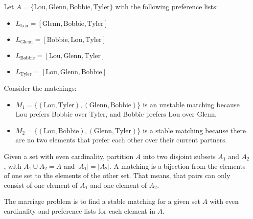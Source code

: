 \begin{eg}
    Let $A = \{\text{Lou}, \text{Glenn}, \text{Bobbie}, \text{Tyler}\}$ with the following preference lists:
    \begin{itemize}[itemsep=1pt,label=$\circ$]
        \item $L_{\text{Lou}} = [\text{Glenn}, \text{Bobbie}, \text{Tyler}]$
        \item $L_{\text{Glenn}} = [\text{Bobbie}, \text{Lou}, \text{Tyler}]$
        \item $L_{\text{Bobbie}} = [\text{Lou}, \text{Glenn}, \text{Tyler}]$
        \item $L_{\text{Tyler}} = [\text{Lou}, \text{Glenn}, \text{Bobbie}]$
    \end{itemize}
    Consider the matchings:
    \begin{itemize}[itemsep=1pt,label=$\circ$]
        \item $M_1 = \{(\text{Lou}, \text{Tyler}), (\text{Glenn}, \text{Bobbie})\}$ is an unstable matching because Lou prefers Bobbie over Tyler, and Bobbie prefers Lou over Glenn.
        \item $M_2 = \{(\text{Lou}, \text{Bobbie}), (\text{Glenn}, \text{Tyler})\}$ is a stable matching because there are no two elements that prefer each other over their current partners.
    \end{itemize}
\end{eg}

\begin{definition}
    Given a set with even cardinality, partition $A$ into two disjoint subsets $A_1$ and $A_2$, with $A_1 \cup A_2 = A$ and $|A_1| = |A_2|$. A matching is a bijection from the elements of one set to the elements of the other set. That means, that pairs can only consist of one element of $A_1$ and one element of $A_2$.
\end{definition}

\begin{definition}
    The marriage problem is to find a stable matching for a given set $A$ with even cardinality and preference lists for each element in $A$.
\end{definition}

